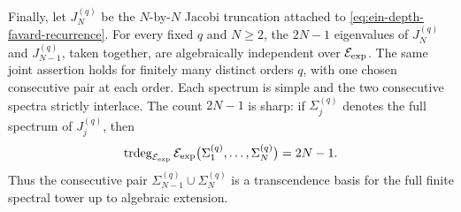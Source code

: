 \begin{corollary}
Finally, let \(J_N^{(q)}\) be the \(N\)-by-\(N\) Jacobi truncation attached
to \eqref{eq:ein-depth-favard-recurrence}.  For every fixed \(q\) and
\(N\geq2\), the \(2N-1\) eigenvalues of
\(J_N^{(q)}\) and \(J_{N-1}^{(q)}\), taken together, are algebraically
independent over \(\mathcal E_{\mathrm{exp}}\).  The same joint assertion holds for finitely
many distinct orders \(q\), with one chosen consecutive pair at each
order.  Each spectrum is simple and the two consecutive spectra strictly
interlace.  The count \(2N-1\) is sharp: if \(\Sigma_j^{(q)}\) denotes
the full spectrum of \(J_j^{(q)}\), then
\begin{equation}\label{eq:ein-depth-full-finite-spectral-rank}
 \operatorname{trdeg}_{\mathcal E_{\mathrm{exp}}}
 \mathcal E_{\mathrm{exp}}\bigl(\Sigma_1^{(q)},\ldots,\Sigma_N^{(q)}\bigr)=2N-1.
\end{equation}
Thus the consecutive pair
\(\Sigma_{N-1}^{(q)}\cup\Sigma_N^{(q)}\) is a transcendence basis for
the full finite spectral tower up to algebraic extension.
\end{corollary}


